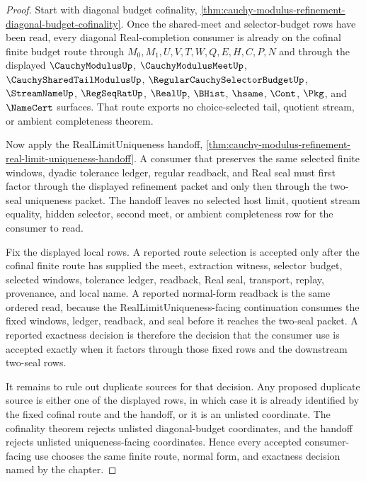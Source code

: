 \begin{proof}
Start with diagonal budget cofinality, \autoref{thm:cauchy-modulus-refinement-diagonal-budget-cofinality}. Once the shared-meet and selector-budget rows have been read, every diagonal Real-completion consumer is already on the cofinal finite budget route through $M_0,M_1,U,V,T,W,Q,E,H,C,P,N$ and through the displayed $\CauchyModulusUp$, $\CauchyModulusMeetUp$, $\CauchySharedTailModulusUp$, $\RegularCauchySelectorBudgetUp$, $\StreamNameUp$, $\RegSeqRatUp$, $\RealUp$, $\BHist$, $\hsame$, $\Cont$, $\Pkg$, and $\NameCert$ surfaces. That route exports no choice-selected tail, quotient stream, or ambient completeness theorem.

Now apply the RealLimitUniqueness handoff, \autoref{thm:cauchy-modulus-refinement-real-limit-uniqueness-handoff}. A consumer that preserves the same selected finite windows, dyadic tolerance ledger, regular readback, and Real seal must first factor through the displayed refinement packet and only then through the two-seal uniqueness packet. The handoff leaves no selected host limit, quotient stream equality, hidden selector, second meet, or ambient completeness row for the consumer to read.

Fix the displayed local rows. A reported route selection is accepted only after the cofinal finite route has supplied the meet, extraction witness, selector budget, selected windows, tolerance ledger, readback, Real seal, transport, replay, provenance, and local name. A reported normal-form readback is the same ordered read, because the RealLimitUniqueness-facing continuation consumes the fixed windows, ledger, readback, and seal before it reaches the two-seal packet. A reported exactness decision is therefore the decision that the consumer use is accepted exactly when it factors through those fixed rows and the downstream two-seal rows.

It remains to rule out duplicate sources for that decision. Any proposed duplicate source is either one of the displayed rows, in which case it is already identified by the fixed cofinal route and the handoff, or it is an unlisted coordinate. The cofinality theorem rejects unlisted diagonal-budget coordinates, and the handoff rejects unlisted uniqueness-facing coordinates. Hence every accepted consumer-facing use chooses the same finite route, normal form, and exactness decision named by the chapter.
\end{proof}
